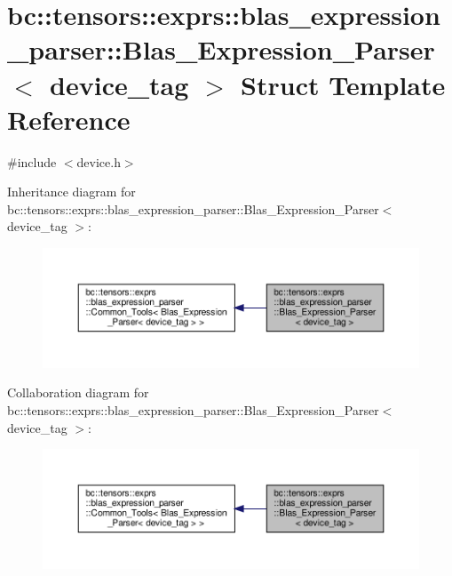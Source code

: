 \hypertarget{structbc_1_1tensors_1_1exprs_1_1blas__expression__parser_1_1Blas__Expression__Parser_3_01device__tag_01_4}{}\section{bc\+:\+:tensors\+:\+:exprs\+:\+:blas\+\_\+expression\+\_\+parser\+:\+:Blas\+\_\+\+Expression\+\_\+\+Parser$<$ device\+\_\+tag $>$ Struct Template Reference}
\label{structbc_1_1tensors_1_1exprs_1_1blas__expression__parser_1_1Blas__Expression__Parser_3_01device__tag_01_4}


{\ttfamily \#include $<$device.\+h$>$}



Inheritance diagram for bc\+:\+:tensors\+:\+:exprs\+:\+:blas\+\_\+expression\+\_\+parser\+:\+:Blas\+\_\+\+Expression\+\_\+\+Parser$<$ device\+\_\+tag $>$\+:\nopagebreak
\begin{figure}[H]
\begin{center}
\leavevmode
\includegraphics[width=350pt]{structbc_1_1tensors_1_1exprs_1_1blas__expression__parser_1_1Blas__Expression__Parser_3_01device__tag_01_4__inherit__graph}
\end{center}
\end{figure}


Collaboration diagram for bc\+:\+:tensors\+:\+:exprs\+:\+:blas\+\_\+expression\+\_\+parser\+:\+:Blas\+\_\+\+Expression\+\_\+\+Parser$<$ device\+\_\+tag $>$\+:\nopagebreak
\begin{figure}[H]
\begin{center}
\leavevmode
\includegraphics[width=350pt]{structbc_1_1tensors_1_1exprs_1_1blas__expression__parser_1_1Blas__Expression__Parser_3_01device__tag_01_4__coll__graph}
\end{center}
\end{figure}
